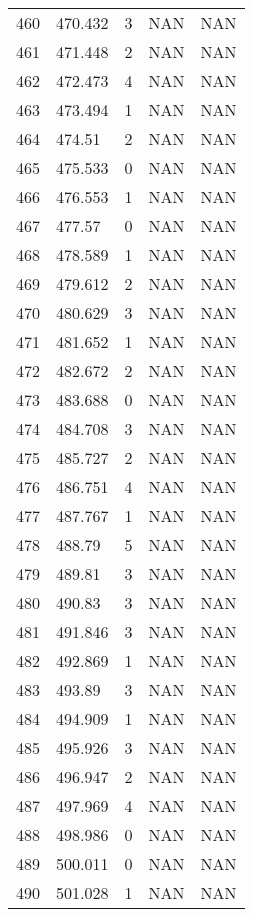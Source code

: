 \documentclass{article}
\begin{document}
\begin{longtable}{@{}lllll@{}}
					460 & 470.432 & 3     & NAN   & NAN   \\
					461 & 471.448 & 2     & NAN   & NAN   \\
					462 & 472.473 & 4     & NAN   & NAN   \\
					463 & 473.494 & 1     & NAN   & NAN   \\
					464 & 474.51  & 2     & NAN   & NAN   \\
					465 & 475.533 & 0     & NAN   & NAN   \\
					466 & 476.553 & 1     & NAN   & NAN   \\
					467 & 477.57  & 0     & NAN   & NAN   \\
					468 & 478.589 & 1     & NAN   & NAN   \\
					469 & 479.612 & 2     & NAN   & NAN   \\
					470 & 480.629 & 3     & NAN   & NAN   \\
					471 & 481.652 & 1     & NAN   & NAN   \\
					472 & 482.672 & 2     & NAN   & NAN   \\
					473 & 483.688 & 0     & NAN   & NAN   \\
					474 & 484.708 & 3     & NAN   & NAN   \\
					475 & 485.727 & 2     & NAN   & NAN   \\
					476 & 486.751 & 4     & NAN   & NAN   \\
					477 & 487.767 & 1     & NAN   & NAN   \\
					478 & 488.79  & 5     & NAN   & NAN   \\
					479 & 489.81  & 3     & NAN   & NAN   \\
					480 & 490.83  & 3     & NAN   & NAN   \\
					481 & 491.846 & 3     & NAN   & NAN   \\
					482 & 492.869 & 1     & NAN   & NAN   \\
					483 & 493.89  & 3     & NAN   & NAN   \\
					484 & 494.909 & 1     & NAN   & NAN   \\
					485 & 495.926 & 3     & NAN   & NAN   \\
					486 & 496.947 & 2     & NAN   & NAN   \\
					487 & 497.969 & 4     & NAN   & NAN   \\
					488 & 498.986 & 0     & NAN   & NAN   \\
					489 & 500.011 & 0     & NAN   & NAN   \\
					490 & 501.028 & 1     & NAN   & NAN   \\

\end{longtable}
\end{document}
